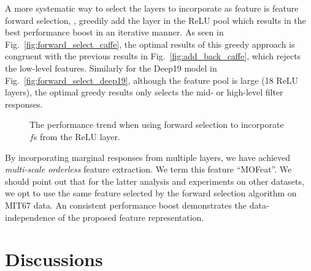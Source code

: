 \documentclass[10pt,twocolumn,letterpaper]{article}
\begin{document}
A more systematic way to select the layers to incorporate as feature is feature forward selection, \ie, greedily add the layer in the ReLU pool which results in the best performance boost in an iterative manner. As seen in Fig.~\ref{fig:forward_select_caffe}, the optimal results of this greedy approach is congruent with the previous results in Fig.~\ref{fig:add_back_caffe}, which rejects the low-level features. Similarly for the Deep19 model in Fig.~\ref{fig:forward_select_deep19}, although the feature pool is large (18 ReLU layers), the optimal greedy results only selects the mid- or high-level filter responses. 

\begin{figure}[htbp]
\centering
\caption{The performance trend when using forward selection to incorporate $f$s from the ReLU layer. }

\label{fig:forward_select}
\end{figure}

By incorporating marginal responses from multiple layers, we have achieved \textit{multi-scale orderless} feature extraction. We term this feature ``MOFeat''. We should point out that for the latter analysis and experiments on other datasets, we opt to use the same feature selected by the forward selection algorithm on MIT67 data. An consistent performance boost demonstrates the data-independence of the proposed feature representation. 

\section{Discussions\label{sec:ana}}
\end{document}
